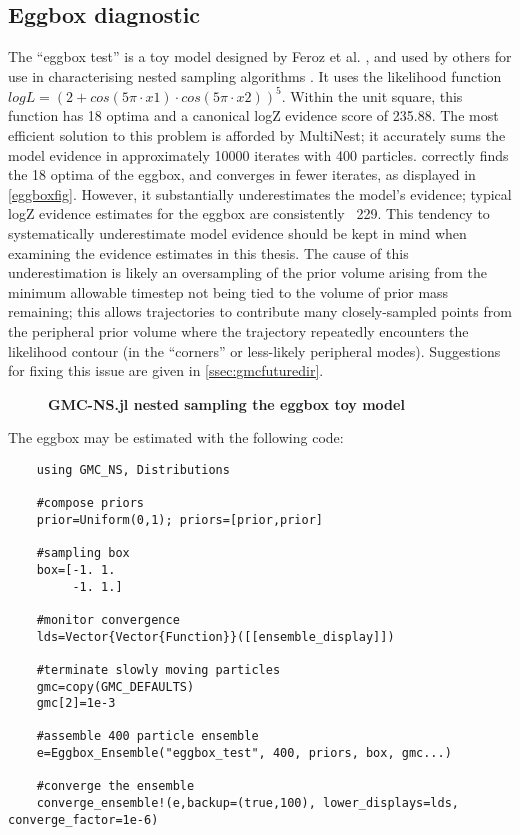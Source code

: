 \subsection{Eggbox diagnostic}
\label{ssec:eggbox}
The ``eggbox test'' is a toy model designed by Feroz et al. \cite{Feroz2009}, and used by others for use in characterising nested sampling algorithms \cite{Buchner2016}. It uses the likelihood function $logL = (2 + cos(5π \cdot x1) \cdot cos(5π \cdot x2))^5$. Within the unit square, this function has 18 optima and a canonical logZ evidence score of 235.88. The most efficient solution to this problem is afforded by MultiNest; it accurately sums the model evidence in approximately 10000 iterates with 400 particles.  correctly finds the 18 optima of the eggbox, and converges in fewer iterates, as displayed in \autoref{eggboxfig}. However, it substantially underestimates the model's evidence; typical  logZ evidence estimates for the eggbox are consistently ~229. This tendency to systematically underestimate model evidence should be kept in mind when examining the evidence estimates in this thesis. The cause of this underestimation is likely an oversampling of the prior volume arising from the minimum allowable timestep not being tied to the volume of prior mass remaining; this allows trajectories to contribute many closely-sampled points from the peripheral prior volume where the trajectory repeatedly encounters the likelihood contour (in the ``corners'' or less-likely peripheral modes). Suggestions for fixing this issue are given in \autoref{ssec:gmcfuturedir}.

\begin{figure}[!h]
    \caption{{\bf GMC-NS.jl nested sampling the eggbox toy model}}
    \label{eggboxfig}
\end{figure}

The eggbox may be estimated with the following code:

\begin{verbatim}
    using GMC_NS, Distributions

    #compose priors
    prior=Uniform(0,1); priors=[prior,prior]

    #sampling box
    box=[-1. 1.
         -1. 1.]

    #monitor convergence
    lds=Vector{Vector{Function}}([[ensemble_display]])

    #terminate slowly moving particles
    gmc=copy(GMC_DEFAULTS)
    gmc[2]=1e-3

    #assemble 400 particle ensemble
    e=Eggbox_Ensemble("eggbox_test", 400, priors, box, gmc...)

    #converge the ensemble
    converge_ensemble!(e,backup=(true,100), lower_displays=lds, converge_factor=1e-6)
\end{verbatim}

